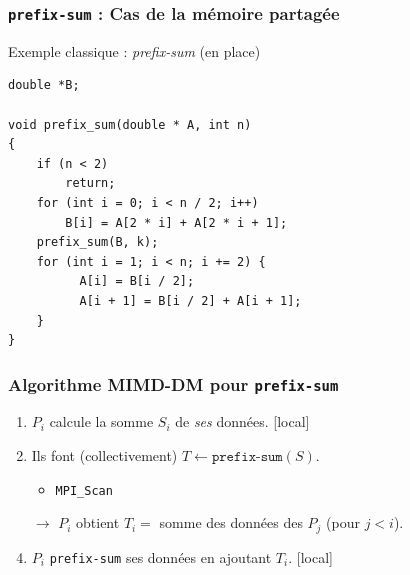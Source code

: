 \documentclass[xcolor={x11names,svgnames}]{beamer}
\begin{document}

\begin{frame}[fragile]
\frametitle{\texttt{prefix-sum} : Cas de la mémoire partagée}


\begin{block}{Exemple classique : \emph{prefix-sum} (en place)}
\begin{verbatim}
double *B;

void prefix_sum(double * A, int n)
{
    if (n < 2)
        return;
    for (int i = 0; i < n / 2; i++)
        B[i] = A[2 * i] + A[2 * i + 1];
    prefix_sum(B, k);
    for (int i = 1; i < n; i += 2) {
          A[i] = B[i / 2];
          A[i + 1] = B[i / 2] + A[i + 1];
    }
}
\end{verbatim}
\end{block}


\end{frame}



\begin{frame}
\frametitle{Algorithme MIMD-DM pour \texttt{prefix-sum}}


\bigskip

\begin{enumerate}
\item $P_i$ calcule la somme $S_i$ de \emph{ses} données. \hfill \alert{[local]}
\item Ils font (collectivement) $T \gets \texttt{prefix-sum}(S)$.
  \begin{itemize}
  \item \texttt{MPI\_Scan}
  \end{itemize}
\item[$\rightarrow$] $P_i$ obtient $T_i = $ somme des données des $P_j$ (pour $j<i$).
\item $P_i$ \texttt{prefix-sum} ses données en ajoutant $T_i$. \hfill \alert{[local]}
\end{enumerate}
\end{frame}
\end{document}
